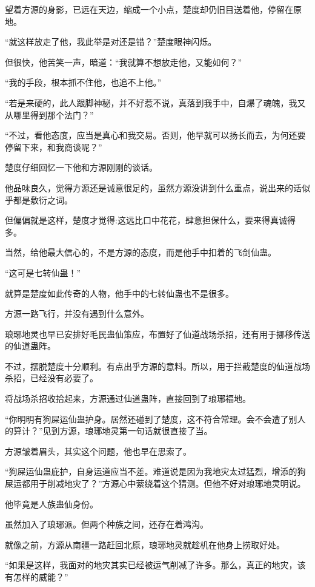 
\begin{this_body}

望着方源的身影，已远在天边，缩成一个小点，楚度却仍旧目送着他，停留在原地。

“就这样放走了他，我此举是对还是错？”楚度眼神闪烁。

但很快，他苦笑一声，暗道：“我就算不想放走他，又能如何？”

“我的手段，根本抓不住他，也追不上他。”

“若是来硬的，此人跟脚神秘，并不好惹不说，真落到我手中，自爆了魂魄，我又从哪里得到那个法门？”

“不过，看他态度，应当是真心和我交易。否则，他早就可以扬长而去，为何还要停留下来，和我商谈呢？”

楚度仔细回忆一下他和方源刚刚的谈话。

他品味良久，觉得方源还是诚意很足的，虽然方源没讲到什么重点，说出来的话似乎都是敷衍之词。

但偏偏就是这样，楚度才觉得:这远比口中花花，肆意担保什么，要来得真诚得多。

当然，给他最大信心的，不是方源的态度，而是他手中扣着的飞剑仙蛊。

“这可是七转仙蛊！”

就算是楚度如此传奇的人物，他手中的七转仙蛊也不是很多。

方源一路飞行，并没有遇到什么意外。

琅琊地灵也早已安排好毛民蛊仙策应，布置好了仙道战场杀招，还有用于挪移传送的仙道蛊阵。

不过，摆脱楚度十分顺利。有点出乎方源的意料。所以，用于拦截楚度的仙道战场杀招，已经没有必要了。

将战场杀招收拾起来，方源通过仙道蛊阵，直接回到了琅琊福地。

“你明明有狗屎运仙蛊护身。居然还碰到了楚度，这不符合常理。会不会遭了别人的算计？”见到方源，琅琊地灵第一句话就很直接了当。

方源皱着眉头，其实这个问题，他也早在思索了。

“狗屎运仙蛊庇护，自身运道应当不差。难道说是因为我地灾太过猛烈，增添的狗屎运都用于削减地灾了？”方源心中萦绕着这个猜测。但他不好对琅琊地灵明说。

他毕竟是人族蛊仙身份。

虽然加入了琅琊派。但两个种族之间，还存在着鸿沟。

就像之前，方源从南疆一路赶回北原，琅琊地灵就趁机在他身上捞取好处。

“如果是这样，我面对的地灾其实已经被运气削减了许多。那么，真正的地灾，该有怎样的威能？”


\end{this_body}
